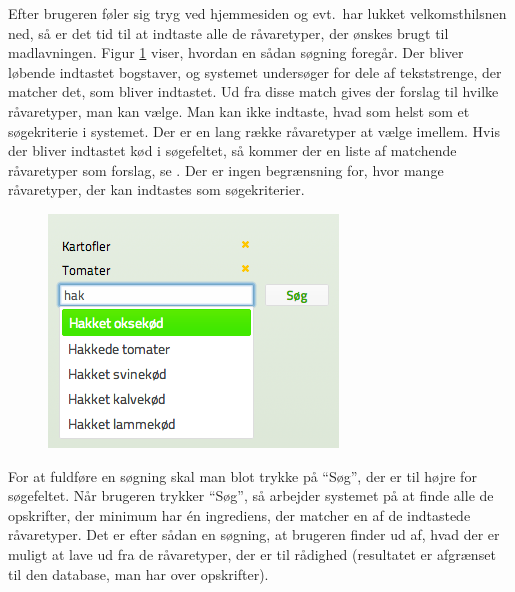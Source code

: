 Efter brugeren føler sig tryg ved hjemmesiden og evt.\ har lukket velkomsthilsnen ned, så er det tid til at indtaste alle de råvaretyper, der ønskes brugt til madlavningen. Figur \ref{fig:foodl-soegefelt} viser, hvordan en sådan søgning foregår. Der bliver løbende indtastet bogstaver, og systemet undersøger for dele af tekststrenge, der matcher det, som bliver indtastet. Ud fra disse match gives der forslag til hvilke råvaretyper, man kan vælge. Man kan ikke indtaste, hvad som helst som et søgekriterie i systemet. Der er en lang række råvaretyper at vælge imellem. Hvis der \fx bliver indtastet kød i søgefeltet, så kommer der en liste af matchende råvaretyper som forslag, se . Der er ingen begrænsning for, hvor mange råvaretyper, der kan indtastes som søgekriterier.

\begin{figure}[H]
	\centering
	\includegraphics[scale=0.6]{billeder/foodl/soegefelt.png}
	\label{fig:foodl-soegefelt}
\end{figure}


For at fuldføre en søgning skal man blot trykke på ``Søg'', der er til højre for søgefeltet. Når brugeren trykker ``Søg'', så arbejder systemet på at finde alle de opskrifter, der minimum har én ingrediens, der matcher en af de indtastede råvaretyper. Det er efter sådan en søgning, at brugeren finder ud af, hvad der er muligt at lave ud fra de råvaretyper, der er til rådighed (resultatet er afgrænset til den database, man har over opskrifter).
